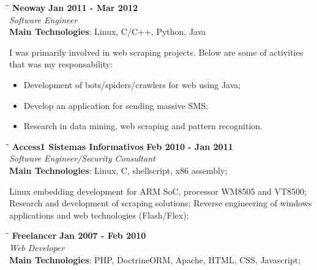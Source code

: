 \documentclass[margin]{res}
\begin{document}
\begin{resume}
   \begin{tabbing}
   \hspace{2.3in}\= \hspace{1.7in}\= \kill %
    \textbf{Neoway}    \>\>\textbf{Jan 2011 - Mar 2012}\\
    \textit{Software Engineer}\\
    \textbf{Main Technologies}: Linux, C/C++, Python, Java
   \end{tabbing}\vspace{-20pt}      %
    \vspace{2mm}
    I was primarily involved in web scraping projects. Below are some of activities that was my responsability:

    \begin{itemize}
  \item Development of bots/spiders/crawlers for web using Java;
  \item Develop an application for sending massive SMS;
  \item Research in data mining, web scraping and pattern recognition.
\end{itemize}


   \vspace{2mm}
   \begin{tabbing}
   \hspace{2.3in}\= \hspace{1.5in}\= \kill %
    \textbf{Access1 Sistemas Informativos}    \>\>\textbf{Feb 2010 - Jan 2011}\\
    \textit{Software Engineer/Security Consultant}\\
    \textbf{Main Technologies}: Linux, C, shellscript, x86 assembly;
   \end{tabbing}\vspace{-20pt}      %
    \vspace{2mm}

    Linux embedding development for ARM SoC, processor WM8505 and VT8500;
    Research and development of scraping solutions;
    Reverse engineering of windows applications and web technologies (Flash/Flex);


   \vspace{2mm}
   \begin{tabbing}
   \hspace{2.3in}\= \hspace{1.5in}\= \kill %
    \textbf{Freelancer}    \>\>\textbf{Jan 2007 - Feb 2010}\\
    \textit{Web Developer}\\
    \textbf{Main Technologies}: PHP, DoctrineORM, Apache, HTML, CSS, Javascript;
   \end{tabbing}\vspace{-20pt}      %
    \vspace{2mm}


\end{resume}
\end{document}
